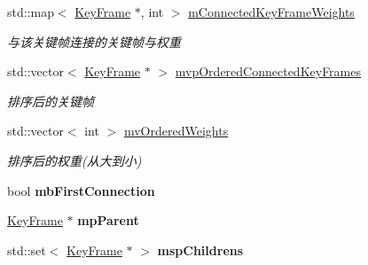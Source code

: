 \begin{DoxyCompactItemize}
\item 
\hypertarget{classORB__SLAM2_1_1KeyFrame_a6a057195e3e9e7d3f08b97b6366e9f81}{std\-::map$<$ \hyperlink{classORB__SLAM2_1_1KeyFrame}{Key\-Frame} $\ast$, int $>$ \hyperlink{classORB__SLAM2_1_1KeyFrame_a6a057195e3e9e7d3f08b97b6366e9f81}{m\-Connected\-Key\-Frame\-Weights}}\label{classORB__SLAM2_1_1KeyFrame_a6a057195e3e9e7d3f08b97b6366e9f81}

\begin{DoxyCompactList}\small\item\em 与该关键帧连接的关键帧与权重 \end{DoxyCompactList}\item 
\hypertarget{classORB__SLAM2_1_1KeyFrame_af4a83f5b32cf53c0ad87702226b9dff8}{std\-::vector$<$ \hyperlink{classORB__SLAM2_1_1KeyFrame}{Key\-Frame} $\ast$ $>$ \hyperlink{classORB__SLAM2_1_1KeyFrame_af4a83f5b32cf53c0ad87702226b9dff8}{mvp\-Ordered\-Connected\-Key\-Frames}}\label{classORB__SLAM2_1_1KeyFrame_af4a83f5b32cf53c0ad87702226b9dff8}

\begin{DoxyCompactList}\small\item\em 排序后的关键帧 \end{DoxyCompactList}\item 
\hypertarget{classORB__SLAM2_1_1KeyFrame_aeac0492454556dc98bb6bd895acfec9b}{std\-::vector$<$ int $>$ \hyperlink{classORB__SLAM2_1_1KeyFrame_aeac0492454556dc98bb6bd895acfec9b}{mv\-Ordered\-Weights}}\label{classORB__SLAM2_1_1KeyFrame_aeac0492454556dc98bb6bd895acfec9b}

\begin{DoxyCompactList}\small\item\em 排序后的权重(从大到小) \end{DoxyCompactList}\item 
\hypertarget{classORB__SLAM2_1_1KeyFrame_a9ad3ef1653d6cfa622994bd2c1bd67c1}{bool {\bfseries mb\-First\-Connection}}\label{classORB__SLAM2_1_1KeyFrame_a9ad3ef1653d6cfa622994bd2c1bd67c1}

\item 
\hypertarget{classORB__SLAM2_1_1KeyFrame_a94bbb0261caf3f1ed0c434c9fca1e886}{\hyperlink{classORB__SLAM2_1_1KeyFrame}{Key\-Frame} $\ast$ {\bfseries mp\-Parent}}\label{classORB__SLAM2_1_1KeyFrame_a94bbb0261caf3f1ed0c434c9fca1e886}

\item 
\hypertarget{classORB__SLAM2_1_1KeyFrame_ac647a33b4a6d158b640c5482ed57bbfe}{std\-::set$<$ \hyperlink{classORB__SLAM2_1_1KeyFrame}{Key\-Frame} $\ast$ $>$ {\bfseries msp\-Childrens}}\label{classORB__SLAM2_1_1KeyFrame_ac647a33b4a6d158b640c5482ed57bbfe}


\end{DoxyCompactItemize}
